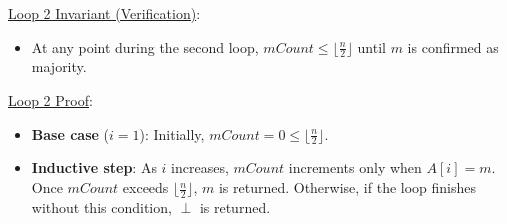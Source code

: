 \begin{parts}
\begin{customsolutionbox}
        \vspace{1em}
        
        \underline{Loop 2 Invariant (Verification)}:
        \begin{itemize}
            \item At any point during the second loop, $mCount \leq \lfloor \frac{n}{2} \rfloor$ until $m$ is confirmed as majority.
        \end{itemize}
        
        \underline{Loop 2 Proof}:
        \begin{itemize}
            \item \textbf{Base case} ($i = 1$): Initially, $mCount = 0 \leq \lfloor \frac{n}{2} \rfloor$.
            \item \textbf{Inductive step}: As $i$ increases, $mCount$ increments only when $A[i] = m$. Once $mCount$ exceeds $\lfloor \frac{n}{2} \rfloor$, $m$ is returned. 
            Otherwise, if the loop finishes without this condition, $\perp$ is returned.
        \end{itemize}
        \end{customsolutionbox}
        
\end{parts}